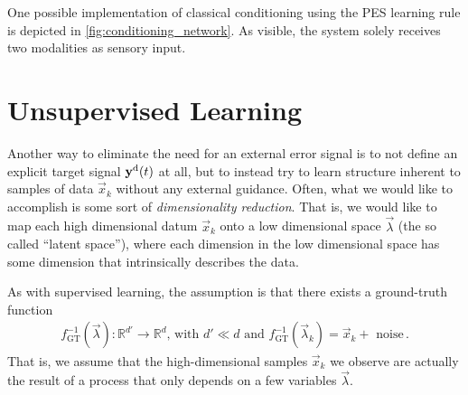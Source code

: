 \documentclass[10pt,letterpaper,oneside]{article}
\begin{document}
One possible implementation of classical conditioning using the PES learning rule is depicted in \cref{fig:conditioning_network}. As visible, the system solely receives two modalities as sensory input.


\section{Unsupervised Learning}

Another way to eliminate the need for an external error signal is to not define an explicit target signal ${\mathbf{y}}^\mathrm{d}(t)$ at all, but to instead try to learn structure inherent to samples of data $\vec x_k$ without any external guidance. Often, what we would like to accomplish is some sort of \emph{dimensionality reduction}. That is, we would like to map each high dimensional datum $\vec x_k$ onto a low dimensional space $\vec \lambda$ (the so called \enquote{latent space}), where each dimension in the low dimensional space has some dimension that intrinsically describes the data.

As with supervised learning, the assumption is that there exists a ground-truth function
\begin{align*}
	f^{-1}_\mathrm{GT}(\vec \lambda) : \mathbb{R}^{d'} \longrightarrow \mathbb{R}^d \text{, with } d' \ll d \text{ and } f^{-1}_\mathrm{GT}(\vec \lambda_k) = \vec x_k + \text{ noise} \,.
\end{align*}
That is, we assume that the high-dimensional samples $\vec x_k$ we observe are actually the result of a process that only depends on a few variables $\vec \lambda$.
\end{document}
